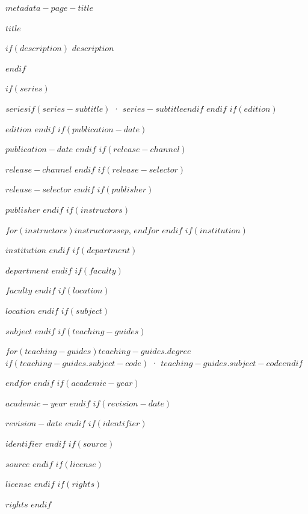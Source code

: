 \documentclass[11pt,a4paper,twoside,openright]{book}
\let\ManualOriginalTexttt\texttt
\renewcommand{\texttt}[1]{{\color{ManualInlineCode}\ManualOriginalTexttt{#1}}}
\begin{document}
\thispagestyle{empty}
\vspace*{0.7cm}
{\LARGE\bfseries\sffamily\color{ManualSecondary}$metadata-page-title$}\par
\vspace{0.35cm}
{\large\bfseries\sffamily $title$}\par
$if(description)$
\vspace{0.2cm}
{\small\color{ManualMuted}$description$}\par
$endif$
\vspace{0.55cm}
\small
\begin{description}[style=multiline,leftmargin=4.95cm,labelwidth=4.5cm,labelsep=0.45cm,itemsep=0.34em,parsep=0pt,topsep=0pt,font=\normalfont\bfseries\sffamily\color{ManualSecondary}]
$if(series)$
  \item[$metadata-series-label$] $series$$if(series-subtitle)$ · $series-subtitle$$endif$
$endif$
$if(edition)$
  \item[$metadata-edition-label$] $edition$
$endif$
$if(publication-date)$
  \item[$metadata-publication-date-label$] $publication-date$
$endif$
$if(release-channel)$
  \item[$metadata-release-channel-label$] $release-channel$
$endif$
$if(release-selector)$
  \item[$metadata-release-version-label$] $release-selector$
$endif$
$if(publisher)$
  \item[$metadata-publisher-label$] $publisher$
$endif$
$if(instructors)$
  \item[$metadata-instructors-label$] $for(instructors)$$instructors$$sep$, $endfor$
$endif$
$if(institution)$
  \item[$metadata-institution-label$] $institution$
$endif$
$if(department)$
  \item[$metadata-department-label$] $department$
$endif$
$if(faculty)$
  \item[$metadata-faculty-label$] $faculty$
$endif$
$if(location)$
  \item[$metadata-location-label$] $location$
$endif$
$if(subject)$
  \item[$metadata-subject-label$] $subject$
$endif$
$if(teaching-guides)$
  \item[$metadata-teaching-guides-label$]
  $for(teaching-guides)$$teaching-guides.degree$$if(teaching-guides.subject-code)$ · \texttt{$teaching-guides.subject-code$}$endif$\par
  $endfor$
$endif$
$if(academic-year)$
  \item[$metadata-academic-year-label$] $academic-year$
$endif$
$if(revision-date)$
  \item[$metadata-revision-date-label$] $revision-date$
$endif$
$if(identifier)$
  \item[$metadata-identifier-label$] $identifier$
$endif$
$if(source)$
  \item[$metadata-source-label$] $source$
$endif$
$if(license)$
  \item[$metadata-license-label$] $license$
$endif$
$if(rights)$
  \item[$metadata-rights-label$] $rights$
$endif$
\end{description}
\clearpage
\end{document}
